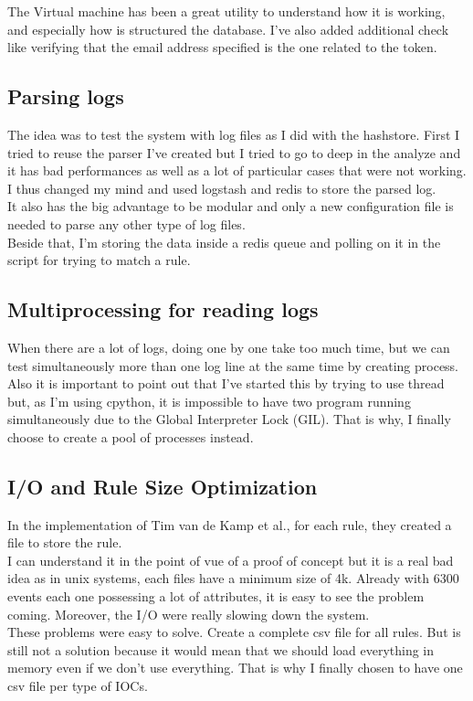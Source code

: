 \documentclass{eplmastersthesis}
\begin{document}
The Virtual machine has been a great utility to understand how it is working, and especially how is structured the database. I've also added additional check like verifying that the email address specified is the one related to the token. 

\subsection{Parsing logs}
The idea was to test the system with log files as I did with the hashstore. First I tried to reuse the parser I've created but I tried to go to deep in the analyze and it has bad performances as well as a lot of particular cases that were not working.\\
I thus changed my mind and used logstash and redis to store the parsed log. \\
It also has the big advantage to be modular and only a new configuration file is needed to parse any other type of log files.\\
Beside that, I'm storing the data inside a redis queue and polling on it in the script for trying to match a rule. 

\subsection{Multiprocessing for reading logs}
When there are a lot of logs, doing one by one take too much time, but we can test simultaneously more than one log line at the same time by creating process.\\
Also it is important to point out that I've started this by trying to use thread but, as I'm using cpython, it is impossible to have two program running simultaneously due to the Global Interpreter Lock (GIL). That is why, I finally choose to create a pool of processes instead.


\subsection{I/O and Rule Size Optimization}
In the implementation of Tim van de Kamp et al., for each rule, they created a file to store the rule. \\
I can understand it in the point of vue of a proof of concept but it is a real bad idea as in unix systems, each files have a minimum size of 4k. Already with 6300 events each one possessing a lot of attributes, it is easy to see the problem coming. Moreover, the I/O were really slowing down the system. \\
These problems were easy to solve. Create a complete csv file for all rules. But is still not a solution because it would mean that we should load everything in memory even if we don't use everything. That is why I finally chosen to have one csv file per type of IOCs.
\end{document}
